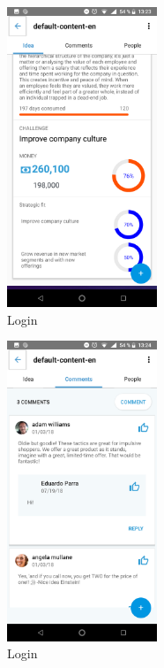 \begin{figure}[!h]
	\begin{center}
		\includegraphics[width=0.4\textwidth]{./img/anexo1/ver_idea_inicio_cont.png}
		\caption{Login}
		\label{fig:ver_idea_inicio_cont}
	\end{center}
\end{figure}

\begin{figure}[!h]
	\begin{center}
		\includegraphics[width=0.4\textwidth]{./img/anexo1/ver_idea_comentarios.png}
		\caption{Login}
		\label{fig:ver_idea_comentarios}
	\end{center}
\end{figure}

